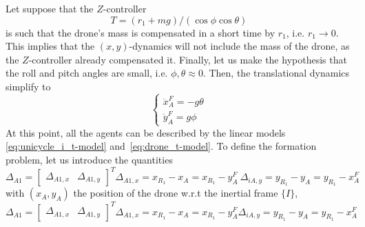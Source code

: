 \documentclass{ifacconf}
\begin{document}
Let suppose that the $Z$-controller 
\begin{equation}
    T = (r_1 + mg) / (\cos \phi \cos \theta)
\end{equation}
is such that the drone's mass is compensated in a short time
by $r_1$, i.e. $r_1 \to 0$.
This implies that the $(x,y)$-dynamics will not include the mass of the drone,
as the $Z$-controller already compensated it.
Finally, let us make the hypothesis that the roll and pitch angles 
are small, i.e. $\phi,\theta \approx 0$.
Then, the translational dynamics simplify to 
\begin{equation}
    \begin{cases}
        \ddot{x}^F_A = -g\theta \\
        \ddot{y}^F_A = g\phi
    \end{cases}
    \label{eq:drone_t-model}
\end{equation}
At this point, all the agents can be described by the linear models
\eqref{eq:unicycle_i_t-model} and~\eqref{eq:drone_t-model}.
To define the formation problem, let us introduce the quantities
\begin{subequations}
    \begin{equation}
        \Delta_{A1} = \begin{bmatrix}
            \Delta_{A1,x} & \Delta_{A1, y}
        \end{bmatrix}^T 
    \end{equation}
    \begin{equation}
        \Delta_{A1,x} = x_{R_1} - x_A = x_{R_1} - y^F_A \  
    \end{equation}
    \begin{equation}
        \Delta_{iA,y} = y_{R_1} - y_A = y_{R_1} - x^F_A
    \end{equation}
\end{subequations}
with $(x_A, y_A)$ the position of the drone w.r.t the inertial frame $\{I\}$,
\begin{subequations}
    \begin{equation}
        \Delta_{A1} = \begin{bmatrix}
        \Delta_{A1,x} & \Delta_{A1, y}
    \end{bmatrix}^T 
    \end{equation}
    \begin{equation}
        \Delta_{A1,x} = x_{R_1} - x_A = x_{R_1} - y^F_A
    \end{equation}
    \begin{equation}
        \Delta_{iA,y} = y_{R_1} - y_A = y_{R_1} - x^F_A
    \end{equation}
\end{subequations}
\end{document}
